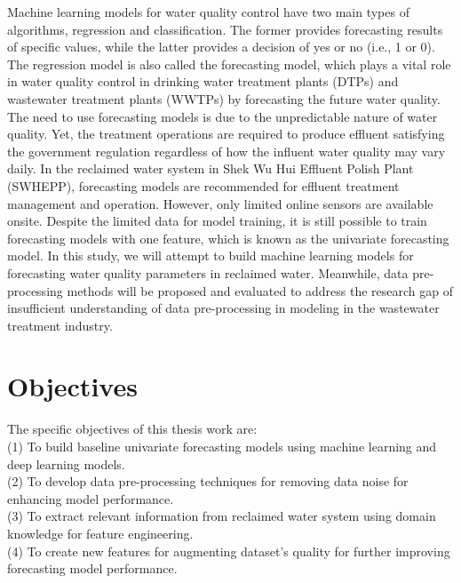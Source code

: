 Machine learning models for water quality control have two main types of algorithms, regression and classification. The former provides forecasting results of specific values, while the latter provides a decision of yes or no (i.e., 1 or 0). The regression model is also called the forecasting model, which plays a vital role in water quality control in drinking water treatment plants (DTPs) 
and wastewater treatment plants (WWTPs) by forecasting the future water quality. The need to use forecasting models is due to the unpredictable nature of water quality. Yet, the treatment operations are required to produce effluent satisfying the government regulation \cite{chenAssessingWastewaterReclamation2003} regardless of how the influent water quality may vary daily. In the reclaimed water system in Shek Wu Hui Effluent Polish Plant (SWHEPP), forecasting models are recommended for effluent treatment management and operation. However, only limited online sensors are available onsite. Despite the limited data for model training, it is still possible to train forecasting models with one feature, which is known as the univariate forecasting model. In this study, we will attempt to build machine learning models for forecasting water quality parameters in reclaimed water. Meanwhile, data pre-processing methods will be proposed and evaluated to address the research gap of insufficient understanding of data pre-processing in modeling in the wastewater treatment industry.




\section{Objectives}
\noindent
The specific objectives of this thesis work are:\\
(1) To build baseline univariate forecasting models using machine learning and deep learning models.\\
(2) To develop data pre-processing techniques for removing data noise for enhancing model performance.\\
(3) To extract relevant information from reclaimed water system using domain knowledge for feature engineering.\\
(4) To create new features for augmenting dataset's quality for further improving forecasting model performance.

